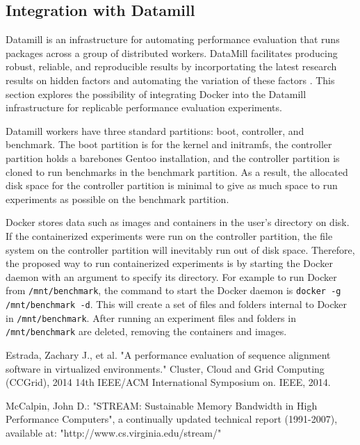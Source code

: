 \documentclass[11pt]{article}
\begin{document}
\begin{itemize}
\subsection{Integration with Datamill}

Datamill is an infrastructure for automating performance evaluation that runs packages across a group of distributed workers. DataMill facilitates producing robust, reliable, and reproducible results by incorportating the latest research results on hidden factors and automating the variation of these factors \cite{augusto}. This section explores the possibility of integrating Docker into the Datamill infrastructure for replicable performance evaluation experiments. 

Datamill workers have three standard partitions: boot, controller, and benchmark. The boot partition is for the kernel and initramfs, the controller partition holds a barebones Gentoo installation, and the controller partition is cloned to run benchmarks in the benchmark partition. As a result, the allocated disk space for the controller partition is minimal to give as much space to run experiments as possible on the benchmark partition. 

Docker stores data such as images and containers in the user’s directory on disk. If the containerized experiments were run on the controller partition, the file system on the controller partition will inevitably run out of disk space. Therefore, the proposed way to run containerized experiments is by starting the Docker daemon with an argument to specify its directory. For example to run Docker from \texttt{/mnt/benchmark}, the command to start the Docker daemon is \texttt{docker -g /mnt/benchmark -d}. This will create a set of files and folders internal to Docker in \texttt{/mnt/benchmark}. After running an experiment files and folders in \texttt{/mnt/benchmark} are deleted, removing the containers and images. 

\begin{thebibliography}{99}
	Estrada, Zachary J., et al. "A performance evaluation of sequence alignment software in virtualized environments." Cluster, Cloud and Grid Computing (CCGrid), 2014 14th IEEE/ACM International Symposium on. IEEE, 2014.
	
	McCalpin, John D.: "STREAM: Sustainable Memory Bandwidth in
	High Performance Computers", a continually updated technical report
	(1991-2007), available at: "http://www.cs.virginia.edu/stream/"
	

\end{thebibliography}
\end{itemize}
\end{document}
